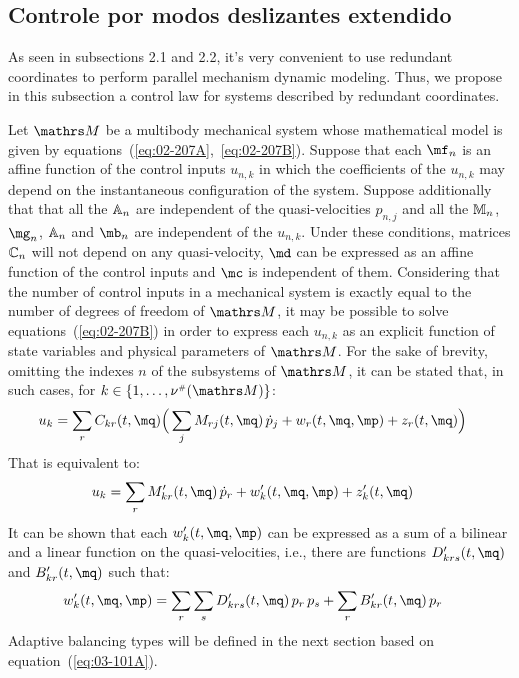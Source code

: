 \subsection{Controle por modos deslizantes extendido}\label{S02-4}

As seen in subsections 2.1 and 2.2, it's very convenient to use redundant coordinates to perform parallel mechanism dynamic modeling. Thus, we propose in this subsection a control law for systems described by redundant coordinates.

Let $\ssM$ be a multibody mechanical system whose mathematical model is given 
by equations~(\ref{eq:02-207A},~\ref{eq:02-207B}).
Suppose that each $\mf_{n}$ is an affine function of the control inputs $u_{n,k}$
in which the coefficients of the $u_{n,k}$ may depend on the instantaneous
configuration of the system.
Suppose additionally that that all the $\mathbb{A}_{n}$ are independent
of the quasi-velocities $p_{n,j}$ and all the $\mathbb{M}_{n}$, $\mg_{n}$, $\mathbb{A}_{n}$ and $\mb_{n}$ 
are independent of the $u_{n,k}$.
Under these conditions, matrices $\mathbb{C}_{n}$ will not depend on 
any quasi-velocity, $\md$ can be expressed as an affine function of the control inputs 
and $\mc$ is independent of them.
Considering that the number of control inputs in a mechanical system is
exactly equal to the number of degrees of freedom of $\ssM$, 
it may be possible to solve equations~(\ref{eq:02-207B}) in order to
express each $u_{n,k}$ as an explicit function of state variables and
physical parameters of $\ssM$.
For the sake of brevity, omitting the indexes $n$ of the subsystems of $\ssM$,
it can be stated that, in such cases, for $k \in \{ 1,\ldots,\nu\ssh(\ssM) \}$:
\begin{align}
&	u_{k} = \sum_{r} C_{kr} (t,\mq) \Big(  \sum_{j} M_{rj}(t,\mq) \, \dot p_j 
		+ w_{r}(t, \mq, \mp)
		+ z_{r}(t, \mq) \Big)
	\label{eq:03-101Especial} 
\end{align}
That is equivalent to:
\begin{align}
&	u_{k} = \sum_{r} M'_{kr}(t,\mq) \, \dot p_r 
		+ w'_{k}(t, \mq, \mp)
		+ z'_{k}(t, \mq)
	\label{eq:03-101A} 
\end{align}
It can be shown that each $w'_{k}(t, \mq, \mp)$ can be expressed as a sum of 
a bilinear and a linear function on the quasi-velocities, i.e., there are functions
$D'_{krs}(t,\mq)$ and $B'_{kr}(t,\mq)$ such that:
\begin{align}	
&	w'_{k}(t, \mq, \mp) = \sum_{r} \sum_{s} D'_{krs}(t,\mq) \, p_r \, p_s
		+ \sum_{r} B'_{kr}(t,\mq) \, p_r
	\label{eq:03-101B}	
\end{align}
Adaptive balancing types will be defined in the next section based on equation~(\ref{eq:03-101A}).

